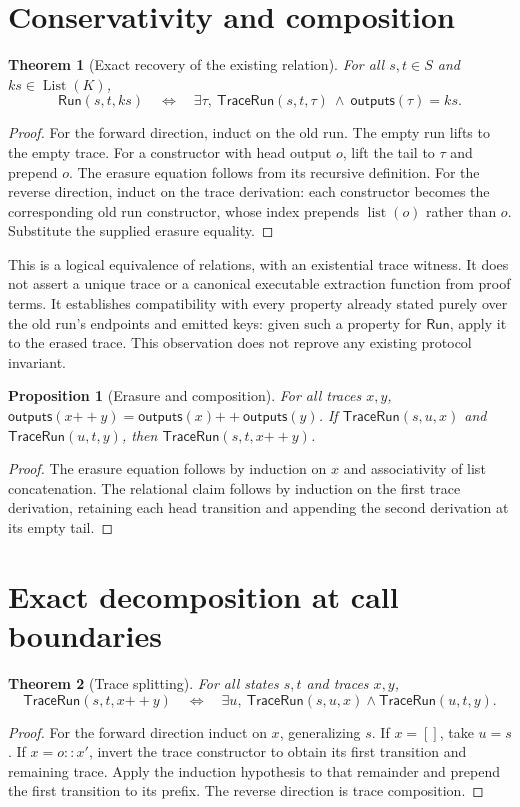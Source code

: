 \documentclass[11pt]{article}
\newtheorem{theorem}{Theorem}
\newtheorem{proposition}{Proposition}
\newcommand{\Run}{\ensuremath{\mathsf{Run}}}
\newcommand{\Trace}{\ensuremath{\mathsf{TraceRun}}}
\newcommand{\erase}{\ensuremath{\mathsf{outputs}}}
\newcommand{\cat}{\mathbin{+\!+}}
\begin{document}
\section{Conservativity and composition}
\begin{theorem}[Exact recovery of the existing relation]
For all $s,t\in S$ and $ks\in\operatorname{List}(K)$,
\[
\Run(s,t,ks)\quad\Longleftrightarrow\quad
\exists\tau,\ \Trace(s,t,\tau)\ \land\ \erase(\tau)=ks.
\]
\end{theorem}
\begin{proof}
For the forward direction, induct on the old run. The empty run lifts to the empty trace.
For a constructor with head output $o$, lift the tail to $\tau$ and prepend $o$.
The erasure equation follows from its recursive definition. For the reverse direction,
induct on the trace derivation: each constructor becomes the corresponding old run
constructor, whose index prepends $\operatorname{list}(o)$ rather than $o$.
Substitute the supplied erasure equality.
\end{proof}

This is a logical equivalence of relations, with an existential trace witness. It does not
assert a unique trace or a canonical executable extraction function from proof terms.
It establishes compatibility with every property already stated purely over the old run's
endpoints and emitted keys: given such a property for \Run, apply it to the erased trace.
This observation does not reprove any existing protocol invariant.

\begin{proposition}[Erasure and composition]
For all traces $x,y$,
$\erase(x\cat y)=\erase(x)\cat\erase(y)$.
If $\Trace(s,u,x)$ and $\Trace(u,t,y)$, then $\Trace(s,t,x\cat y)$.
\end{proposition}
\begin{proof}
The erasure equation follows by induction on $x$ and associativity of list concatenation.
The relational claim follows by induction on the first trace derivation, retaining each
head transition and appending the second derivation at its empty tail.
\end{proof}

\section{Exact decomposition at call boundaries}
\begin{theorem}[Trace splitting]
For all states $s,t$ and traces $x,y$,
\[
\Trace(s,t,x\cat y)\quad\Longleftrightarrow\quad
\exists u,\ \Trace(s,u,x)\land\Trace(u,t,y).
\]
\end{theorem}
\begin{proof}
For the forward direction induct on $x$, generalizing $s$. If $x=[]$, take $u=s$.
If $x=o::x'$, invert the trace constructor to obtain its first transition and remaining
trace. Apply the induction hypothesis to that remainder and prepend the first transition
to its prefix. The reverse direction is trace composition.
\end{proof}
\end{document}
